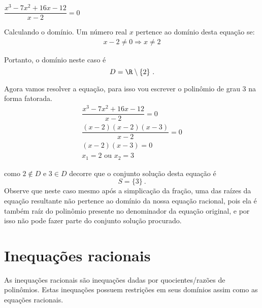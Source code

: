   \begin{exem} $\dfrac{x^3 - 7x^2 + 16x -12}{x-2}=0 $
 
 Calculando o domínio. Um número real $x$ pertence ao domínio desta equação se:
 \begin{eqnarray}
  x - 2 \neq 0  \Rightarrow x \neq 2
 \end{eqnarray}
 
 Portanto, o domínio neste caso é
 \[D= \R \setminus \{2\} \ . \]
 
 Agora vamos resolver a equação, para isso vou escrever o polinômio de grau 3 na forma fatorada.
 \begin{eqnarray}
 \dfrac{x^3 - 7x^2 + 16x -12}{x-2}=0 \\
 \dfrac{(x-2)(x-2)(x-3)}{x -2}=0 \\
 (x-2)(x-3)=0 \\
 x_1= 2 \text{ ou } x_2= 3
 \end{eqnarray}
 
 como $2 \notin D$ e $3 \in D$ decorre que o conjunto solução desta equação é
 \[S= \{ 3 \} \ . \]
 Observe que neste caso mesmo após a simplicação da fração, uma das raízes da equação resultante não pertence ao domínio da nossa equação racional, pois ela é também raíz do polinômio presente no denominador da equação original, e por isso não pode fazer parte do conjunto solução procurado.
 \end{exem}
 
 \section{Inequações racionais}

 \vskip0.3cm
 \colorbox{azul}{
 \begin{minipage}{0.9\linewidth}
 \begin{center}
  As inequações racionais são inequações dadas por quocientes/razões de polinômios. Estas inequações possuem restrições em seus domínios assim como as equações racionais.
 \end{center}
 \end{minipage}}
 \vskip0.3cm
 

